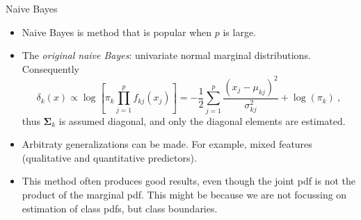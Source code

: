 \documentclass[10pt,ignorenonframetext,]{beamer}
\providecommand{\tightlist}{%
  \setlength{\itemsep}{0pt}\setlength{\parskip}{0pt}}
\begin{document}
\begin{frame}

\begin{block}{Naive Bayes}

\vspace{2mm}

\begin{itemize}
\tightlist
\item
  Naive Bayes is method that is popular when \(p\) is large.
\end{itemize}

\vspace{2mm}

\begin{itemize}
\tightlist
\item
  The \emph{original naive Bayes}: univariate normal marginal
  distributions. Consequently
  \[\delta_k (x) \propto \log \left[ \pi_k \prod_{j=1}^p f_{kj}(x_j) \right] = - \frac{1}{2} \sum_{j=1}^p \frac{(x_j - \mu_{kj})^2}{\sigma_{kj}^2} + \log(\pi_k) \ , \]
  thus \(\boldsymbol{\Sigma}_k\) is assumed diagonal, and only the
  diagonal elements are estimated.
\end{itemize}

\vspace{2mm}

\begin{itemize}
\tightlist
\item
  Arbitraty generalizations can be made. For example, mixed features
  (qualitative and quantitative predictors).
\end{itemize}

\vspace{2mm}

\begin{itemize}
\tightlist
\item
  This method often produces good results, even though the joint pdf is
  not the product of the marginal pdf. This might be because we are not
  focussing on estimation of class pdfs, but class boundaries.
\end{itemize}

\end{block}

\end{frame}
\end{document}
